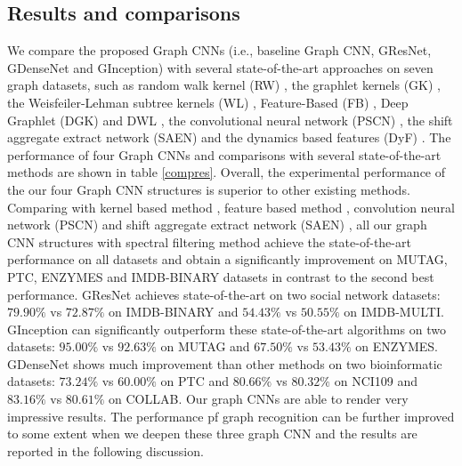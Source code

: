 \documentclass[journal]{IEEEtran}
\begin{document}
\subsection{Results and comparisons}
We compare the proposed Graph CNNs (i.e., baseline Graph CNN, G\underline{\hspace{0.5em}}ResNet, G\underline{\hspace{0.5em}}DenseNet and G\underline{\hspace{0.5em}}Inception) with several state-of-the-art approaches on seven graph datasets, such as random walk kernel (RW) \cite{rw2003}, the graphlet kernels (GK) \cite{gk2009}, the Weisfeiler-Lehman subtree kernels (WL) \cite{wl2011}, Feature-Based (FB) \cite{BrunaZSL13}, Deep Graphlet (DGK) and DWL \cite{DGKandDWL2015}, the convolutional neural network (PSCN) \cite{niepert2016learning}, the shift aggregate extract network (SAEN) \cite{saen2017} and the dynamics based features (DyF) \cite{DyGraph2017}.
The performance of four Graph CNNs and comparisons with several state-of-the-art methods are shown in table \ref{compres}.
Overall, the experimental performance of the our four Graph CNN structures is superior to other existing methods.
Comparing with kernel based method \cite{rw2003,gk2009,wl2011,DGKandDWL2015}, feature based method \cite{BrunaZSL13,DyGraph2017}, convolution neural network (PSCN) \cite{niepert2016learning} and shift aggregate extract network (SAEN) \cite{saen2017}, all our graph CNN structures with spectral filtering method achieve the state-of-the-art performance on all datasets and obtain a significantly improvement on MUTAG, PTC, ENZYMES and IMDB-BINARY datasets in contrast to the second best performance.
G\underline{\hspace{0.5em}}ResNet achieves state-of-the-art on two social network datasets: $79.90\%$ vs $72.87\%$ \cite{DyGraph2017} on IMDB-BINARY and $54.43\%$ vs $50.55\%$ \cite{wl2011} on IMDB-MULTI.
G\underline{\hspace{0.5em}}Inception can significantly outperform these state-of-the-art algorithms on two datasets: $95.00\%$ vs $92.63\%$ \cite{niepert2016learning} on MUTAG and $67.50\%$ vs $53.43\%$ \cite{DGKandDWL2015} on ENZYMES.
G\underline{\hspace{0.5em}}DenseNet shows much improvement than other methods on two  bioinformatic datasets: $73.24\%$ vs $60.00\%$ \cite{niepert2016learning} on PTC and $80.66\%$ vs $80.32\%$ \cite{DGKandDWL2015} on NCI109 and $83.16\%$ vs $80.61\%$ \cite{DyGraph2017} on COLLAB.
Our graph CNNs are able to render very impressive results. The performance pf graph recognition can be further improved to some extent when we deepen these three graph CNN and the results are reported in the following discussion.
\end{document}
